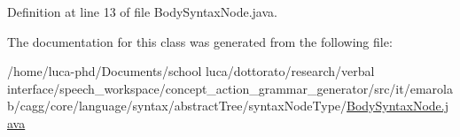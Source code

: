 Definition at line 13 of file Body\-Syntax\-Node.\-java.



The documentation for this class was generated from the following file\-:\begin{DoxyCompactItemize}
\item 
/home/luca-\/phd/\-Documents/school luca/dottorato/research/verbal interface/speech\-\_\-workspace/concept\-\_\-action\-\_\-grammar\-\_\-generator/src/it/emarolab/cagg/core/language/syntax/abstract\-Tree/syntax\-Node\-Type/\hyperlink{BodySyntaxNode_8java}{Body\-Syntax\-Node.\-java}\end{DoxyCompactItemize}
